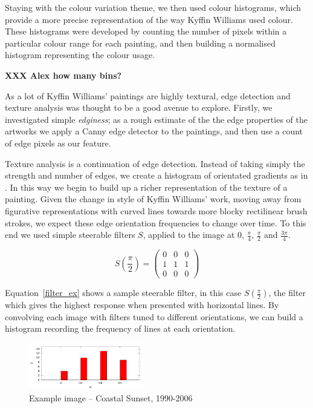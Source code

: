 \documentclass[conference,a4paper]{IEEEtran}
\begin{document}
Staying with the colour variation theme, we then used colour histograms, which
provide a more precise representation of the way Kyffin Williams used colour.
These histograms were developed by counting the number of pixels within a
particular colour range for each painting, and then building a normalised
histogram representing the colour usage. 

\textbf{XXX Alex how many bins? }
 
As a lot of Kyffin Williams' paintings are highly textural, edge detection and
texture analysis was thought to be a good avenue to explore.  Firstly, we
investigated simple \emph{edginess}; as a rough estimate of the the edge
properties of the artworks we apply a Canny \cite{Canny1986Computational} edge
detector to the paintings, and then use a count of edge pixels as our feature. 

Texture analysis is a continuation of edge detection. Instead of taking simply
the strength and number of edges, we create a histogram of orientated gradients
as in \cite{Dalal2005Histograms}. In this way we begin to build up a richer
representation of the texture of a painting. Given the change in style of
Kyffin Williams' work, moving away from figurative representations with curved
lines towards more blocky rectilinear brush strokes, we expect these edge
orientation frequencies to change over time. To this end we used simple
steerable filters $S$, applied to the image at $0$, $\frac{\pi}{4}$,
$\frac{\pi}{2}$ and $\frac{3\pi}{4}$. 

\begin{equation}
S\left(\frac{\pi}{2}\right) = \left( \begin{array}{ccc}
0 & 0 & 0 \\
1 & 1 & 1 \\
0 & 0 & 0 \end{array} \right)
\label{filter_ex}
\end{equation}

Equation~\ref{filter_ex} shows a sample steerable filter, in this case
$S(\frac{\pi}{2})$, the filter which gives the highest response when presented
with horizontal lines. By convolving each image with filters tuned to different
orientations, we can build a histogram recording the frequency of lines at each
orientation.

\begin{figure}[h]
\centering
\includegraphics[width=0.45\textwidth]{img/steerable}
\caption{Example image -- Coastal Sunset, 1990-2006}\label{fig:example-img}
\end{figure}
\end{document}
